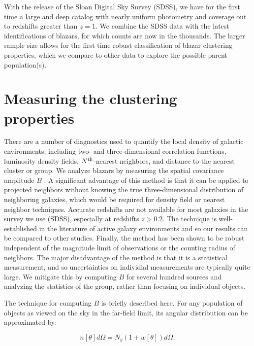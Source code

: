 \documentclass{emulateapj}
\begin{document}
With the release of the Sloan Digital Sky Survey (SDSS), we have for the first time a large and deep catalog with nearly uniform photometry and coverage out to redshifts greater than $z=1$. We combine the SDSS data with the latest identifications of blazars, for which counts are now in the thousands. The larger sample size allows for the first time robust classification of blazar clustering properties, which we compare to other data to explore the possible parent population(s).


\section{Measuring the clustering properties}\label{sec:methods}

There are a number of diagnostics used to quantify the local density of galactic environments, including two- and three-dimensional correlation functions, luminosity density fields, $N^{{\rm th}}$-nearest neighbors, and distance to the nearest cluster or group. We analyze blazars by measuring the spatial covariance amplitude $B$ \citep{lon79}. A significant advantage of this method is that it can be applied to projected neighbors without knowing the true three-dimensional distribution of neighboring galaxies, which would be required for density field or nearest neighbor techniques. Accurate redshifts are not available for most galaxies in the survey we use (SDSS), especially at redshifts $z>0.2$. The technique is well-established in the literature of active galaxy environments \citep[e.g.,][]{pre88,yee87,ell89,wur97} and so our results can be compared to other studies. Finally, the method has been shown to be robust independent of the magnitude limit of observations or the counting radius of neighbors. The major disadvantage of the method is that it is a statistical measurement, and so uncertainties on individial measurements are typically quite large. We mitigate this by computing $B$ for several hundred sources and analyzing the statistics of the group, rather than focusing on individual objects. 

The technique for computing $B$ is briefly described here. For any population of objects as viewed on the sky in the far-field limit, its angular distribution can be approximated by:

\begin{equation}
\label{eqn:angcov}
n[\theta]d\Omega = N_g (1 + w[\theta]) d\Omega,
\end{equation}
\end{document}
